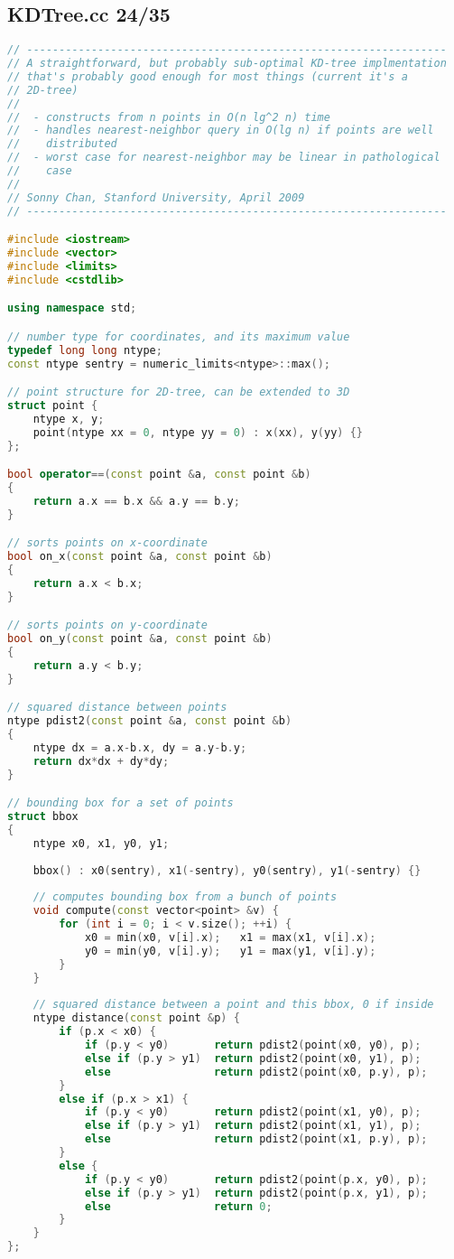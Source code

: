\subsection{KDTree.cc 24/35}
\begin{lstlisting}[language=C++]
// -----------------------------------------------------------------
// A straightforward, but probably sub-optimal KD-tree implmentation
// that's probably good enough for most things (current it's a
// 2D-tree)
//
//  - constructs from n points in O(n lg^2 n) time
//  - handles nearest-neighbor query in O(lg n) if points are well
//    distributed
//  - worst case for nearest-neighbor may be linear in pathological
//    case
//
// Sonny Chan, Stanford University, April 2009
// -----------------------------------------------------------------

#include <iostream>
#include <vector>
#include <limits>
#include <cstdlib>

using namespace std;

// number type for coordinates, and its maximum value
typedef long long ntype;
const ntype sentry = numeric_limits<ntype>::max();

// point structure for 2D-tree, can be extended to 3D
struct point {
    ntype x, y;
    point(ntype xx = 0, ntype yy = 0) : x(xx), y(yy) {}
};

bool operator==(const point &a, const point &b)
{
    return a.x == b.x && a.y == b.y;
}

// sorts points on x-coordinate
bool on_x(const point &a, const point &b)
{
    return a.x < b.x;
}

// sorts points on y-coordinate
bool on_y(const point &a, const point &b)
{
    return a.y < b.y;
}

// squared distance between points
ntype pdist2(const point &a, const point &b)
{
    ntype dx = a.x-b.x, dy = a.y-b.y;
    return dx*dx + dy*dy;
}

// bounding box for a set of points
struct bbox
{
    ntype x0, x1, y0, y1;
    
    bbox() : x0(sentry), x1(-sentry), y0(sentry), y1(-sentry) {}
    
    // computes bounding box from a bunch of points
    void compute(const vector<point> &v) {
        for (int i = 0; i < v.size(); ++i) {
            x0 = min(x0, v[i].x);   x1 = max(x1, v[i].x);
            y0 = min(y0, v[i].y);   y1 = max(y1, v[i].y);
        }
    }
    
    // squared distance between a point and this bbox, 0 if inside
    ntype distance(const point &p) {
        if (p.x < x0) {
            if (p.y < y0)       return pdist2(point(x0, y0), p);
            else if (p.y > y1)  return pdist2(point(x0, y1), p);
            else                return pdist2(point(x0, p.y), p);
        }
        else if (p.x > x1) {
            if (p.y < y0)       return pdist2(point(x1, y0), p);
            else if (p.y > y1)  return pdist2(point(x1, y1), p);
            else                return pdist2(point(x1, p.y), p);
        }
        else {
            if (p.y < y0)       return pdist2(point(p.x, y0), p);
            else if (p.y > y1)  return pdist2(point(p.x, y1), p);
            else                return 0;
        }
    }
};


\end{lstlisting}

